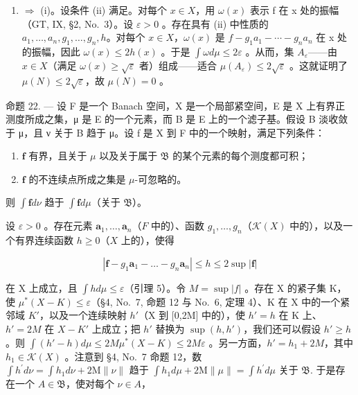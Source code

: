 \begin{enumerate}
\def\labelenumi{(\roman{enumi})}
\setcounter{enumi}{1}
\tightlist
\item
  \(\Rightarrow\) (i)。设条件 (ii) 满足。对每个 \(x \in X\)，用 \(\omega(x)\) 表示 f 在 x 处的振幅（GT, IX, §2, No.~3）。设 \(\varepsilon > 0\) 。存在具有 (ii) 中性质的 \(a_{1}, \ldots, a_{n}, g_{1}, \ldots, g_{n}, h\)。对每个 \(x \in X\)，\(\omega(x)\) 是 \(f - g_{1}a_{1} - \cdots - g_{n}a_{n}\) 在 x 处的振幅，因此 \(\omega(x) \leqslant 2h(x)\) 。于是 \(\int \omega d\mu \leqslant 2\varepsilon\) 。从而，集 \(A_{\varepsilon}\)——由 \(x \in X\)（满足 \(\omega(x) \geqslant \sqrt{\varepsilon}\) 者）组成——适合 \(\mu(A_{\varepsilon}) \leqslant 2\sqrt{\varepsilon}\) 。这就证明了 \(\mu(N) \leqslant 2\sqrt{\varepsilon}\)，故 \(\mu(N) = 0\) 。
\end{enumerate}

命题 22. --- 设 F 是一个 Banach 空间，X 是一个局部紧空间，E 是 X 上有界正测度所成之集，μ 是 E 的一个元素，而 B 是 E 上的一个滤子基。假设 B 淡收敛于 μ，且 \textbar\textbar ν\textbar\textbar{} 关于 B 趋于 \textbar\textbar μ\textbar\textbar{}。设 f 是 X 到 F 中的一个映射，满足下列条件：

\begin{enumerate}
\def\labelenumi{(\roman{enumi})}
\item
  \(\mathbf{f}\) 有界，且关于 \(\mu\) 以及关于属于 \(\mathfrak{B}\) 的某个元素的每个测度都可积；
\item
  \(\mathbf{f}\) 的不连续点所成之集是 \(\mu\)-可忽略的。
\end{enumerate}

则 \(\int \mathbf{f}d\nu\) 趋于 \(\int \mathbf{f}d\mu\)（关于 \(\mathfrak{B}\)）。

设 \(\varepsilon > 0\) 。存在元素 \(\mathbf{a}_1, \ldots, \mathbf{a}_n\)（\(F\) 中的）、函数 \(g_1, \ldots, g_n\)（\(\mathcal{K}(X)\) 中的），以及一个有界连续函数 \(h \geqslant 0\)（\(X\) 上的），使得

\[
\left| \mathbf {f} - g _ {1} \mathbf {a} _ {1} - \dots - g _ {n} \mathbf {a} _ {n} \right| \leqslant h \leqslant 2 \sup | \mathbf {f} |
\]

在 X 上成立，且 \(\int h d\mu \leqslant \varepsilon\)（引理 5）。令 \(M = \sup |f|\) 。存在 X 的紧子集 K，使 \(\mu^{*}(X - K) \leqslant \varepsilon\)（§4, No.~7, 命题 12 与 No.~6, 定理 4）、K 在 X 中的一个紧邻域 \(K'\)，以及一个连续映射 \(h'\)（X 到 {[}0,2M{]} 中的），使 \(h' = h\) 在 K 上、\(h' = 2M\) 在 \(X - K'\) 上成立；把 \(h'\) 替换为 \(\sup(h, h')\)，我们还可以假设 \(h' \geqslant h\) 。则 \(\int(h' - h) d\mu \leqslant 2M\mu^{*}(X - K) \leqslant 2M\varepsilon\) 。另一方面，\(h' = h_1 + 2M\)，其中 \(h_1 \in \mathcal{K}(X)\) 。注意到 §4, No.~7 命题 12，数 \(\int h^{\prime}d\nu = \int h_{1}d\nu +2\mathrm{M}\| \nu \| \text{ 趋于 } \int h_{1}d\mu +2\mathrm{M}\| \mu \| = \int h^{\prime}d\mu \text{ 关于 } \mathfrak{B}.\) 于是存在一个 \(A\in \mathfrak{B}\)，使对每个 \(\nu \in A\)，


